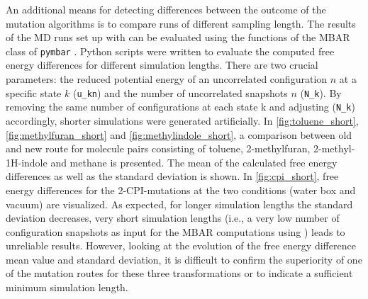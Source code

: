 An additional means for detecting differences between the outcome of the mutation algorithms is to compare runs of different sampling length. 
The results of the MD runs set up with {\trafo} can be evaluated using the functions of the MBAR class of \texttt{pymbar} \cite{Shirts.2008}. Python scripts were written to evaluate the computed free energy differences for different simulation lengths. There are two crucial parameters: the reduced potential energy of an uncorrelated configuration $n$ at a specific state $k$ (\texttt{u\_kn}) and the number of uncorrelated snapshots $n$ (\texttt{N\_k}). By removing the same number of configurations at each state k and adjusting (\texttt{N\_k}) accordingly, shorter simulations were generated artificially.
In \ref{fig:toluene_short}, \ref{fig:methylfuran_short} and \ref{fig:methylindole_short}, a comparison between old and new route for molecule pairs consisting of toluene, 2-methylfuran, 2-methyl-1H-indole and methane is presented. The mean of the calculated free energy differences as well as the standard deviation is shown. In \ref{fig:cpi_short}, free energy differences for the 2-CPI-mutations at the two conditions (water box and vacuum) are visualized. 
As expected, for longer simulation lengths the standard deviation decreases, very short simulation lengths (i.e., a very low number of configuration snapshots as input for the MBAR computations using ) leads to unreliable results. However, looking at the evolution of the free energy difference mean value and standard deviation, it is difficult to confirm the superiority of one of the mutation routes for these three transformations or to indicate a sufficient minimum simulation length.




